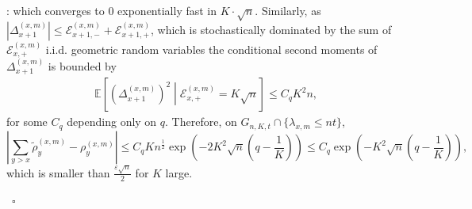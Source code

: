 \documentclass[twoside,12pt,a4paper]{article}
\numberwithin{equation}{section}
\newenvironment{proof}[1][Proof]{{\sc #1}:}{~\hfill $\square$}
\newcommand{\abs}[1]{\left\vert #1 \right\vert}
\begin{document}
\begin{proof}[Proof of Lemma~\ref{lm: approx local drift by conditional means}]
		which converges to $0$ exponentially fast in $K \cdot \sqrt{n}$. Similarly, as $\abs{\Delta_{x+1}^{(x,m)}} \leq  \mathcal{E}_{x+1,-}^{(x,m)} + \mathcal{E}_{x+1,+}^{(x,m)}$, which is stochastically dominated by the sum of $ \mathcal{E}_{x,+}^{(x,m)}$ i.i.d. geometric random variables the conditional second moments of $ \Delta_{x+1}^{(x,m)} $ is bounded by 
		\begin{align*}
			\mathbb{E}\left[ \left(\Delta_{x+1}^{(x,m)}\right)^2 \middle| \mathcal{E}_{x,+}^{(x,m)} = K \sqrt{n}  \right] \leq  C_q K^2 n,
		\end{align*} for some $C_q$ depending only on $q$.
		Therefore, on $G_{n,K,t} \cap \{ \lambda_{x,m} \leq nt \}$,
		\begin{equation}\label{eq: difference of cond means}
		\left| \sum_{y > x} \tilde\rho_y^{(x,m)} - \rho_y^{(x,m)} \right| \le C_q K n^{\frac{1}{2}} \exp\left( - 2K^2 \sqrt{n}(q - \frac{1}{K}) \right) \leq  C_q\exp\left( - K^2 \sqrt{n}(q - \frac{1}{K}) \right), 
		\end{equation}
	which is smaller than $\frac{\varepsilon \sqrt{n}}{2}$ for $K$ large.
		
		
	

\end{proof}
\end{document}
